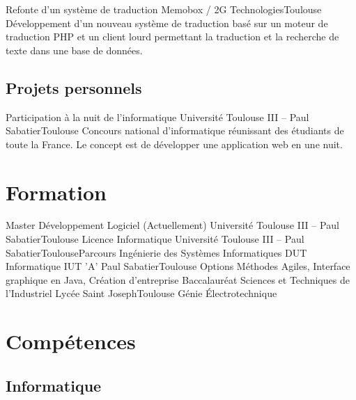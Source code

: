 \documentclass{my_cv_bis}
\begin{document}
	{ Refonte d’un système de traduction }
	{Memobox / 2G Technologies}{Toulouse}
	{Développement d'un nouveau système de traduction basé sur un moteur de traduction PHP et un client lourd
	permettant la traduction et la recherche de texte dans une base de données.  } {}
	\subsection{Projets personnels}
	{Participation à la nuit de l'informatique}
	{Université Toulouse III -- Paul Sabatier}{Toulouse}
	{ Concours national d’informatique réunissant des étudiants de toute la France. Le concept est de développer une application web en une nuit.} 
	{}
	\vspace{-20px}
\section{Formation}
	{Master Développement Logiciel (Actuellement)}
	{Université Toulouse III -- Paul Sabatier}{Toulouse}{}{}
	{Licence Informatique}
	{Université Toulouse III -- Paul Sabatier}{Toulouse}{Parcours Ingénierie des Systèmes Informatiques}{}
	{DUT Informatique}
	{IUT 'A' Paul Sabatier}{Toulouse}
	{Options Méthodes Agiles, Interface graphique en Java, Création d'entreprise}
	{}
	{Baccalauréat Sciences et Techniques de l'Industriel}
	{Lycée Saint Joseph}{Toulouse}
	{Génie Électrotechnique}{}
	\vspace{-20px}
\section{Compétences}
		\subsection{Informatique}
		\\
		\\
		\\
		\\
		\\
\end{document}
